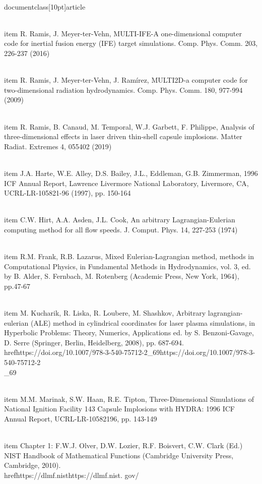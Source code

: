 \\documentclass[10pt]{article}
\begin{document}
{{{{  \\item R. Ramis, J. Meyer-ter-Vehn, MULTI-IFE-A one-dimensional computer code for inertial fusion energy (IFE) target simulations. Comp. Phys. Comm. 203, 226-237 (2016)

  \\item R. Ramis, J. Meyer-ter-Vehn, J. Ramírez, MULTI2D-a computer code for two-dimensional radiation hydrodynamics. Comp. Phys. Comm. 180, 977-994 (2009)

  \\item R. Ramis, B. Canaud, M. Temporal, W.J. Garbett, F. Philippe, Analysis of three-dimensional effects in laser driven thin-shell capsule implosions. Matter Radiat. Extremes 4, 055402 (2019)

  \\item J.A. Harte, W.E. Alley, D.S. Bailey, J.L., Eddleman, G.B. Zimmerman, 1996 ICF Annual Report, Lawrence Livermore National Laboratory, Livermore, CA, UCRL-LR-105821-96 (1997), pp. 150-164

  \\item C.W. Hirt, A.A. Asden, J.L. Cook, An arbitrary Lagrangian-Eulerian computing method for all flow speeds. J. Comput. Phys. 14, 227-253 (1974)

  \\item R.M. Frank, R.B. Lazarus, Mixed Eulerian-Lagrangian method, methods in Computational Physics, in Fundamental Methods in Hydrodynamics, vol. 3, ed. by B. Alder, S. Fernbach, M. Rotenberg (Academic Press, New York, 1964), pp.47-67

  \\item M. Kucharik, R. Liska, R. Loubere, M. Shashkov, Arbitrary lagrangian-eulerian (ALE) method in cylindrical coordinates for laser plasma simulations, in Hyperbolic Problems: Theory, Numerics, Applications ed. by S. Benzoni-Gavage, D. Serre (Springer, Berlin, Heidelberg, 2008), pp. 687-694. \\href{https://doi.org/10.1007/978-3-540-75712-2_69}{https://doi.org/10.1007/978-3-540-75712-2\\_69}

  \\item M.M. Marinak, S.W. Haan, R.E. Tipton, Three-Dimensional Simulations of National Ignition Facility 143 Capsule Implosions with HYDRA: 1996 ICF Annual Report, UCRL-LR-10582196, pp. 143-149

  \\item Chapter 1: F.W.J. Olver, D.W. Lozier, R.F. Boisvert, C.W. Clark (Ed.) NIST Handbook of Mathematical Functions (Cambridge University Press, Cambridge, 2010). \\href{https://dlmf.nist}{https://dlmf.nist}. gov/

}}}}
\end{document}
